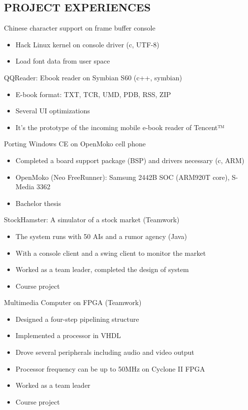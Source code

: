 \documentclass[11pt]{res} %
\begin{document}
\begin{resume}
\section{PROJECT EXPERIENCES}
Chinese character support on frame buffer console

\begin{itemize} \itemsep -2pt
\item Hack Linux kernel on console driver (c, UTF-8)
\item Load font data from user space
\end{itemize}

QQReader: Ebook reader on Symbian S60  (c++, symbian)

\begin{itemize} \itemsep -2pt
\item E-book format: TXT, TCR, UMD, PDB, RSS, ZIP
\item Several UI optimizations
\item It’s the prototype of the incoming mobile e-book reader of Tencent™
\end{itemize}

Porting Windows CE on OpenMoko cell phone

\begin{itemize} \itemsep -2pt
\item Completed a board support package (BSP) and drivers necessary (c, ARM)
\item OpenMoko (Neo FreeRunner): Samsung 2442B SOC (ARM920T core), S-Media 3362
\item Bachelor thesis
\end{itemize}

StockHamster: A simulator of a stock market (Teamwork)

\begin{itemize} \itemsep -2pt
\item The system runs with 50 AIs and a rumor agency (Java)
\item With a console client and a swing client to monitor the market
\item Worked as a team leader, completed the design of system
\item Course project
\end{itemize}

Multimedia Computer on FPGA (Teamwork)

\begin{itemize} \itemsep -2pt
\item Designed a four-step pipelining structure
\item Implemented a processor in VHDL
\item Drove several peripherals including audio and video output
\item Processor frequency can be up to 50MHz on Cyclone II FPGA
\item Worked as a team leader
\item Course project
\end{itemize}


\end{resume}
\end{document}
